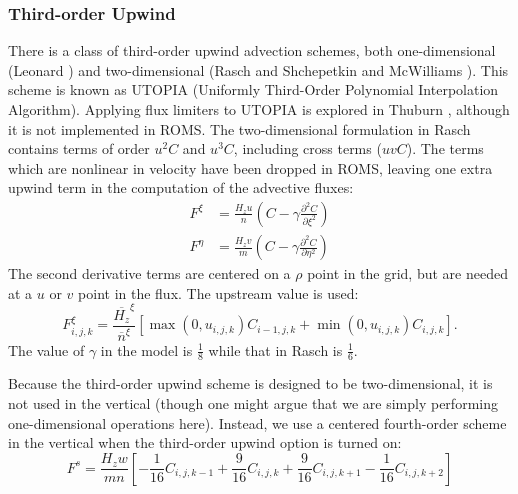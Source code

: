 \subsubsection{Third-order Upwind}
There is a class of third-order upwind advection schemes, both
one-dimensional (Leonard \cite{Leonard79}) and two-dimensional (Rasch
\cite{Rasch94} and Shchepetkin and McWilliams \cite{SS98}). This scheme
is known as UTOPIA (Uniformly Third-Order Polynomial Interpolation
Algorithm). Applying flux limiters to UTOPIA is explored in Thuburn
\cite{Thuburn96}, although it is not implemented in ROMS. The
two-dimensional formulation in Rasch contains terms of order $u^2C$
and $u^3C$, including cross terms ($uvC$). The terms which are
nonlinear in velocity have been dropped in ROMS, leaving one extra upwind
term in the computation of the advective fluxes:
\begin{align}
   F^\xi &= \frac{H_z u}{n} \left( C - \gamma \frac{\partial^2
   C}{\partial \xi^2} \right) \\
   F^\eta &= \frac{H_z v}{m} \left( C - \gamma \frac{\partial^2
   C}{\partial \eta^2} \right)
\end{align}
The second derivative terms are centered on a $\rho$ point in the grid,
but are needed at a $u$ or $v$ point in the flux. The upstream value is
used:
\begin{equation}
   F^\xi_{i,j,k} = \frac{\overline{H_z}^\xi}{\overline{n}^\xi}
   \left[ \max(0,u_{i,j,k}) C_{i-1,j,k} +
   \min(0,u_{i,j,k}) C_{i,j,k} \right] .
\label{equp}
\end{equation}
The value of $\gamma$ in the model is
$\frac{1}{8}$ while that in Rasch \cite{Rasch94} is $\frac{1}{6}$.

Because the third-order upwind scheme is designed to be
two-dimensional, it is not used in the vertical (though one might argue
that we are simply performing one-dimensional operations here).
Instead, we use a centered fourth-order scheme in the vertical when
the third-order upwind option is turned on:
\begin{equation}
   F^s = \frac{H_z w}{mn} \left[
     - \frac{1}{16} C_{i,j,k-1} + \frac{9}{16} C_{i,j,k} +
       \frac{9}{16} C_{i,j,k+1} - \frac{1}{16} C_{i,j,k+2} \right]
\end{equation}


